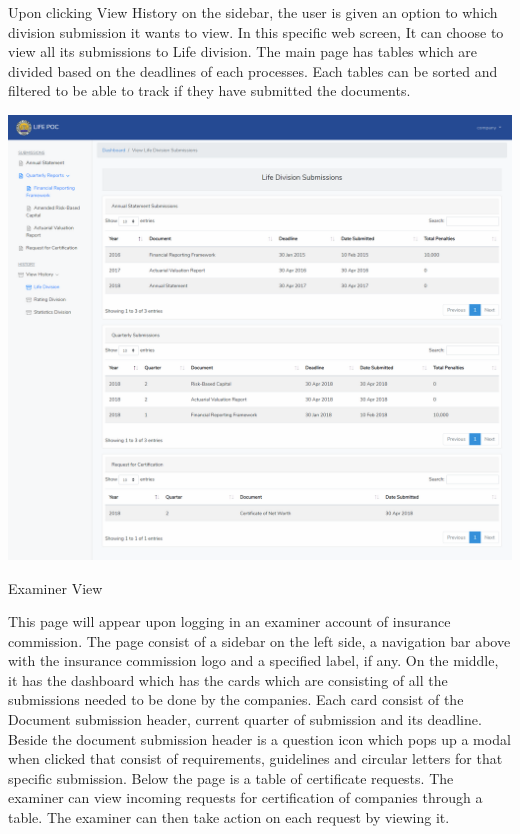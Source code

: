 \documentclass{article}
\begin{document}
\mdhr{}%

\noindent{}Upon clicking View History on the sidebar, the user is
given an option to which division submission it wants to view. In this
specific web screen, It can choose to view all its submissions to Life
division. The main page has tables which are divided based on the
deadlines of each processes. Each tables can be sorted and filtered to
be able to track if they have submitted the documents.%

\includegraphics[keepaspectratio=true]{up-ic-screens/image99}{}%

\mdhr{}%

\noindent{}Examiner View%

This page will appear upon logging in an examiner
account of insurance commission. The page consist of a sidebar on the
left side, a navigation bar above with the insurance commission logo and
a specified label, if any. On the middle, it has the dashboard which has
the cards which are consisting of all the submissions needed to be done
by the companies. Each card consist of the Document submission header,
current quarter of submission and its deadline. Beside the document
submission header is a question icon which pops up a modal when clicked
that consist of requirements, guidelines and circular letters for that
specific submission. Below the page is a table of certificate requests.
The examiner can view incoming requests for certification of companies
through a table. The examiner can then take action on each request by
viewing it.%
\end{document}
